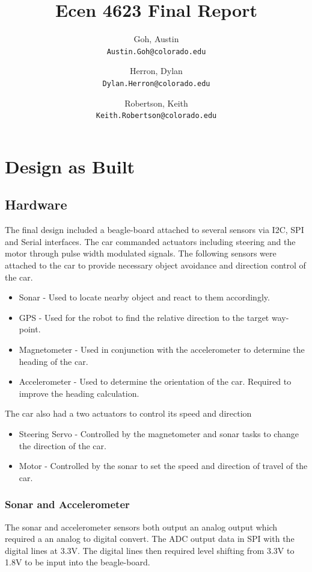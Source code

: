 \documentclass[final,letterpaper,singleside,12pt]{article}
\title{Ecen 4623 Final Report}
\author{
Goh, Austin\\
\texttt{Austin.Goh@colorado.edu}
\and
Herron, Dylan\\
\texttt{Dylan.Herron@colorado.edu}
\and
Robertson, Keith\\
\texttt{Keith.Robertson@colorado.edu}
}
\begin{document}
\maketitle
\pagebreak
\tableofcontents
\pagebreak
\section{Design as Built} %
\label{sec:design_as_built}
\subsection{Hardware} %
\label{sub:hardware}
The final design included a beagle-board attached to several sensors via I2C, SPI and Serial interfaces. The car commanded actuators including steering and the motor through pulse width modulated signals. The following sensors were attached to the car to provide necessary object avoidance and direction control of the car.
\begin{itemize}
	\item Sonar - Used to locate nearby object and react to them accordingly.
	\item GPS - Used for the robot to find the relative direction to the target way-point.
	\item Magnetometer - Used in conjunction with the accelerometer to determine the heading of the car.
	\item Accelerometer - Used to determine the orientation of the car. Required to improve the heading calculation.
\end{itemize}
The car also had a two actuators to control its speed and direction
\begin{itemize}
	\item Steering Servo - Controlled by the magnetometer and sonar tasks to change the direction of the car.
	\item Motor - Controlled by the sonar to set the speed and direction of travel of the car.
\end{itemize}
\subsubsection{Sonar and Accelerometer} %
\label{ssub:sonar}
The sonar and accelerometer sensors both output an analog output which required a an analog to digital convert. The ADC output data in SPI with the digital lines at 3.3V. The digital lines then required level shifting from 3.3V to 1.8V to be input into the beagle-board. 
\end{document}
